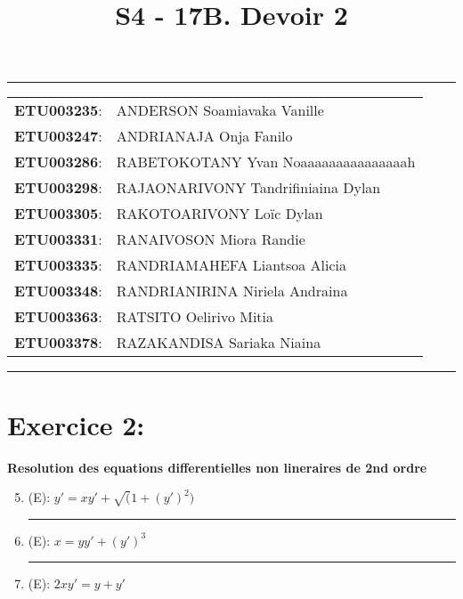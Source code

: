 \documentclass[a4paper,12pt]{article}
\begin{document}
	
\title{\textbf{S4 - 17B. Devoir 2}}
\date{}
\maketitle

\hrule
\vspace{1em}

\begin{tabular}{rl}
	\textbf{ETU003235}: & ANDERSON Soamiavaka Vanille \\
	\textbf{ETU003247}: & ANDRIANAJA Onja Fanilo \\
	\textbf{ETU003286}: & RABETOKOTANY Yvan Noaaaaaaaaaaaaaaah \\
	\textbf{ETU003298}: & RAJAONARIVONY Tandrifiniaina Dylan \\
	\textbf{ETU003305}: & RAKOTOARIVONY Loïc Dylan \\
	\textbf{ETU003331}: & RANAIVOSON Miora Randie \\
	\textbf{ETU003335}: & RANDRIAMAHEFA Liantsoa Alicia \\
	\textbf{ETU003348}: & RANDRIANIRINA Niriela Andraina \\
	\textbf{ETU003363}: & RATSITO Oelirivo Mitia \\
	\textbf{ETU003378}: & RAZAKANDISA Sariaka Niaina \\
\end{tabular}

\vspace{1em}
\hrule

\newpage
\section*{Exercice 2:}
\textbf{Resolution des equations differentielles non lineraires de 2nd ordre}

\begin{enumerate}
	\setcounter{enumi}{4}
	\vspace{1cm}
	\item (E): $y' = xy' + \sqrt(1+(y')^2)$ \\
	
	
	\vspace{1cm}
	\hrule
	\vspace{1cm}

	\item (E): $x = yy' + (y')^3$ \\
	
	
	\vspace{1cm}
	\hrule
	\vspace{1cm}

	\item (E): $2xy' = y + y'$ \\
	
	\vspace{1cm}
	

\end{enumerate}
\end{document}
